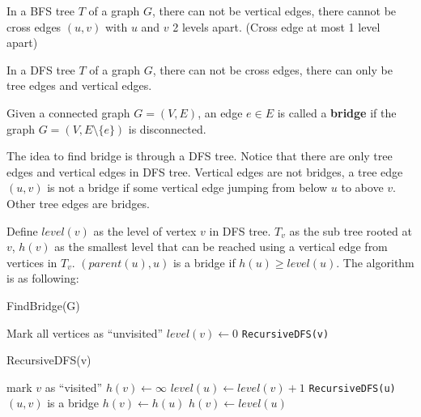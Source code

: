 				In a BFS tree $T$ of a graph $G$, there can not be vertical edges, there cannot be cross edges $(u, v)$ with $u$ and $v$ 2 levels apart. (Cross edge at most 1 level apart)

				In a DFS tree $T$ of a graph $G$, there can not be cross edges, there can only be tree edges and vertical edges.

				\begin{definition}[bridge]
					Given a connected graph $G=(V, E)$, an edge $e \in E$ is called a \textbf{bridge} if the graph $G=(V, E\setminus \{e\})$ is disconnected.
				\end{definition}

				The idea to find bridge is through a DFS tree. Notice that there are only tree edges and vertical edges in DFS tree. Vertical edges are not bridges, a tree edge $(u, v)$ is not a bridge if some vertical edge jumping from below $u$ to above $v$. Other tree edges are bridges.

				Define $level(v)$ as the level of vertex $v$ in DFS tree. $T_v$ as the sub tree rooted at $v$, $h(v)$ as the smallest level that can be reached using a vertical edge from vertices in $T_v$. $(parent(u), u)$ is a bridge if $h(u) \ge level(u)$. The algorithm is as following:
				\begin{algorithm}[h]
					\caption{FindBridge(G)}
					\begin{algorithmic}[1]
						\State Mark all vertices as ``unvisited''
								\State $level(v) \gets 0$
								\State \texttt{RecursiveDFS(v)}
							\EndIf
						\EndFor
					\end{algorithmic}
				\end{algorithm}

				\begin{algorithm}[h]
					\caption{RecursiveDFS(v)}
					\begin{algorithmic}[1]
						\State mark $v$ as ``visited''
						\State $h(v) \gets \infty$
								\State $level(u) \gets level(v) + 1$
								\State \texttt{RecursiveDFS(u)}
									\State $(u, v)$ is a bridge
								\EndIf
									\State $h(v) \gets h(u)$
								\EndIf
							\Else
									\State $h(v) \gets level(u)$
								\EndIf
							\EndIf
						\EndFor
					\end{algorithmic}
				\end{algorithm}
